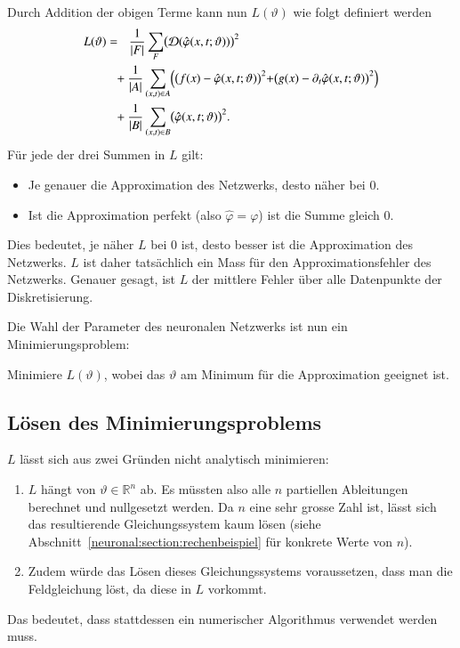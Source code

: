 Durch Addition der obigen Terme kann nun \( L(\vartheta) \) wie folgt definiert werden
\begin{align}
        L(\vartheta)
&=\phantom{+}
	\frac{1}{\lvert F \rvert}
	\sum_{F} \bigl(\mathcal{D}(\hat{\varphi}(x, t; \vartheta))\bigr)^2
	\notag
\\
        &\phantom{=} +
	\frac{1}{\lvert A \rvert}
	\sum_{(x,t)\in A}
	\Bigl(\bigl(f(x) - \hat{\varphi}(x, t; \vartheta)\bigl)^2
        + \bigl(g(x) - \partial_t \hat{\varphi}(x, t; \vartheta)\bigr)^2\Bigr)
	\notag
\\
        &\phantom{=} +
	\frac{1}{\lvert B \rvert}
	\sum_{(x,t)\in B} \bigl(\hat{\varphi}(x, t; \vartheta)\bigr)^2.
    \label{neuronal:optimierung}
\end{align}
Für jede der drei Summen in \( L \) gilt:
\begin{itemize}
    \item Je genauer die Approximation des Netzwerks, desto näher bei 0.
    \item Ist die Approximation perfekt (also \( \hat{\varphi} = \varphi \)) ist die Summe gleich 0.
\end{itemize}
Dies bedeutet, je näher \( L \) bei 0 ist, desto besser ist die Approximation des Netzwerks.
$L$ ist daher tatsächlich ein Mass für den Approximationsfehler des Netzwerks.
Genauer gesagt, ist $L$ der mittlere Fehler über alle Datenpunkte der Diskretisierung.

Die Wahl der Parameter des neuronalen Netzwerks ist nun ein Minimierungsproblem:
%
\begin{aufgabe}
    Minimiere $L(\vartheta)$, wobei das $\vartheta$ am Minimum für die Approximation geeignet ist.
\end{aufgabe}

\subsection{Lösen des Minimierungsproblems}\label{neuronal:subsection:lösen_optimierungsproblem}
\( L \) lässt sich aus zwei Gründen nicht analytisch minimieren:
\begin{enumerate}
    \item \( L \) hängt von \( \vartheta \in \mathbb{R}^n \) ab. 
    Es müssten also alle \( n \) partiellen Ableitungen berechnet und nullgesetzt werden. 
    Da \( n \) eine sehr grosse Zahl ist, lässt sich das resultierende Gleichungssystem kaum lösen (siehe Abschnitt~\ref{neuronal:section:rechenbeispiel} für konkrete Werte von $n$).
    \item Zudem würde das Lösen dieses Gleichungssystems voraussetzen, dass man die Feldgleichung löst, da diese in $L$ vorkommt.
\end{enumerate}
Das bedeutet, dass stattdessen ein numerischer Algorithmus verwendet werden muss.

